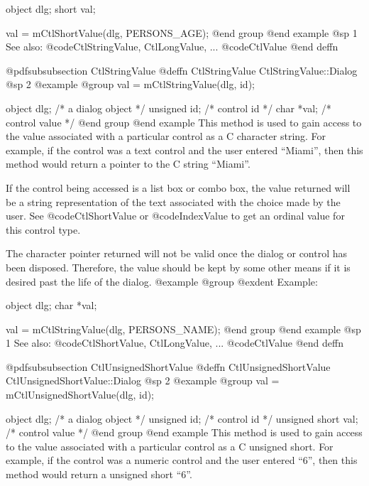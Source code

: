 object  dlg;
short   val;

val = mCtlShortValue(dlg, PERSONS_AGE);
@end group
@end example
@sp 1
See also:  @code{CtlStringValue, CtlLongValue, ...}
        @code{CtlValue}
@end deffn















@pdfsubsubsection {CtlStringValue}
@deffn {CtlStringValue} CtlStringValue::Dialog
@sp 2
@example
@group
val = mCtlStringValue(dlg, id);

object  dlg;    /*  a dialog object  */
unsigned id;    /*  control id       */
char    *val;   /*  control value    */
@end group
@end example
This method is used to gain access to the value associated with a
particular control as a C character string.  For example, if the control
was a text control and the user entered ``Miami'', then this method
would return a pointer to the C string ``Miami''.

If the control being accessed is a list box or combo box, the value
returned will be a string representation of the text associated with the
choice made by the user.  See @code{CtlShortValue} or @code{IndexValue}
to get an ordinal value for this control type.

The character pointer returned will not be valid once the dialog or
control has been disposed.  Therefore, the value should be kept by
some other means if it is desired past the life of the dialog.
@example
@group
@exdent Example:

object  dlg;
char    *val;

val = mCtlStringValue(dlg, PERSONS_NAME);
@end group
@end example
@sp 1
See also:  @code{CtlShortValue, CtlLongValue, ...}
        @code{CtlValue}
@end deffn











@pdfsubsubsection {CtlUnsignedShortValue}
@deffn {CtlUnsignedShortValue} CtlUnsignedShortValue::Dialog
@sp 2
@example
@group
val = mCtlUnsignedShortValue(dlg, id);

object  dlg;    /*  a dialog object  */
unsigned id;    /*  control id       */
unsigned short  val;    /*  control value    */
@end group
@end example
This method is used to gain access to the value associated with a
particular control as a C unsigned short.  For example, if the control
was a numeric control and the user entered ``6'', then this method
would return a unsigned short ``6''.


